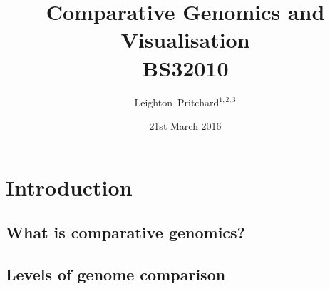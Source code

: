 

%



\title[Comparative Genomics and Visualisation] %
{Comparative Genomics and \\ Visualisation \\
BS32010 \\}
\author[Pritchard] %
{Leighton~Pritchard$^{1,2,3}$}
\date[21st March 2016] %
{21st March 2016}
\subject{Bioinformatics, Genomics, Bacteria, Sequencing, Microbiology, Microbes, Comparative Genomics, Visualisation}





\frame[plain]{\titlepage}



\section{Introduction}

\subsection{What is comparative genomics?}

\subsection{Levels of genome comparison}





